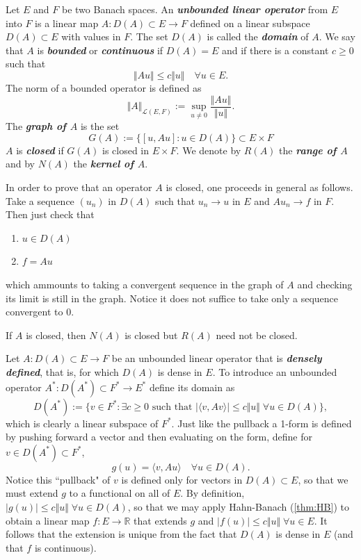 \documentclass{article}
\theoremstyle{definition}
\numberwithin{equation}{section}
\newcommand{\R}{\mathbb{R}}
\begin{document}
	Let  $E$ and $F$ be two Banach spaces. An \textbf{\textit{unbounded linear operator}} from $E$ into $F$ is a linear map $A:D(A)\subset E\to F$ defined on a linear subspace $D(A)\subset E$ with values in $F$. The set $D(A)$ is called the \textbf{\textit{domain}} of $A$. We say that $A$ is \textbf{\textit{bounded}} or \textbf{\textit{continuous}} if $D(A)=E$ and if there is a constant $c\geq0$ such that
	\[\Vert Au\Vert\leq c\Vert u\Vert\quad\forall u\in E.\]
	The norm of a bounded operator is defined as
	\[\Vert A\Vert_{\mathcal{L}(E,F)}:=\sup_{u\neq0}\frac{\Vert Au\Vert}{\Vert u\Vert}.\]
	The \textbf{\textit{graph of $A$}} is the set
	\[G(A):=\{[u,Au]:u\in D(A)\}\subset E\times F\]
	$A$ is \textbf{\textit{closed}} if $G(A)$ is closed in $E\times F$. We denote by $R(A)$ the \textbf{\textit{range of $A$}} and by $N(A)$ the \textbf{\textit{kernel of $A$}}.
	\begin{remark}
		In order to prove that an operator $A$ is closed, one proceeds in general as follows. Take a sequence $(u_n)$ in $D(A)$ such that $u_n\to u$ in $E$ and $Au_n\to f$ in $F$. Then just check that
		\begin{enumerate}
			\item $u\in D(A)$
			\item $f=Au$
		\end{enumerate}
		which ammounts to taking a convergent sequence in the graph of $A$ and checking its limit is still in the graph. Notice it does not suffice to take only a sequence convergent to 0.
	\end{remark}
	\begin{remark}
		If $A$ is closed, then $N(A)$ is closed but $R(A)$ need not be closed.
	\end{remark}
	Let $A:D(A)\subset E\to F$ be an unbounded linear operator that is \textbf{\textit{densely defined}}, that is, for which $D(A)$ is dense in $E$. To introduce an unbounded operator $A^*:D(A^*)\subset F^*\to E^*$ define its domain as
	\[D(A^*):=\{v\in F^*:\exists c\geq0\text{ such that }|\langle v,Av\rangle|\leq c\Vert u \Vert\;\forall u\in D(A)\},\]
	which is clearly a linear subspace of $F^*$. Just like the pullback a 1-form is defined by pushing forward a vector and then evaluating on the form, define for $v\in D(A^*)\subset F^*$,
	\[g(u)=\langle v,Au\rangle\quad\forall u\in D(A).\]
	Notice this ``pullback" of $v$ is defined only for vectors in $D(A)\subset E$, so that we must extend $g$ to a functional on all of $E$. By definition, $|g(u)|\leq c\Vert u\Vert\;\forall u\in D(A)$, so that we may apply Hahn-Banach (\cref{thm:HB}) to obtain a linear map $f:E\to\R$ that extends $g$ and $|f(u)|\leq c\Vert u\Vert\;\forall u\in E$. It follows that the extension is unique from the fact that $D(A)$ is dense in $E$ (and that $f$ is continuous).
	
\end{document}

